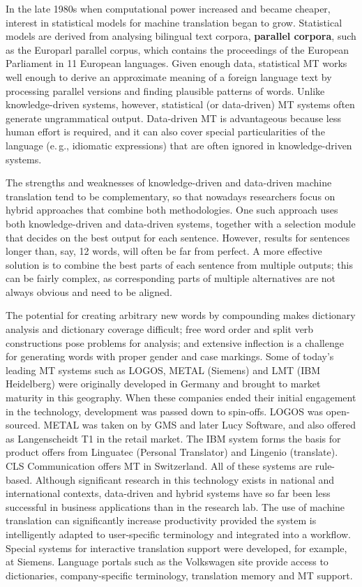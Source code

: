\documentclass[]{../../metanetpaper}
\begin{document}
\begin{multicols}{2}
In the late 1980s when computational power increased and became cheaper, interest in statistical models for machine translation began to grow. Statistical models are derived from analysing bilingual text corpora, \textbf{parallel corpora}, such as the Europarl parallel corpus, which contains the proceedings of the European Parliament in 11 European languages. Given enough data, statistical MT works well enough to derive an approximate meaning of a foreign language text by processing parallel versions and finding plausible patterns of words. Unlike knowledge-driven systems, however, statistical (or data-driven) MT systems often generate ungrammatical output. Data-driven MT is advantageous because less human effort is required, and it can also cover special particularities of the language (e.\,g., idiomatic expressions) that are often ignored in knowledge-driven systems. 

The strengths and weaknesses of knowledge-driven and data-driven machine translation tend to be complementary, so that nowadays researchers focus on hybrid approaches that combine both methodologies. One such approach uses both knowledge-driven and data-driven systems, together with a selection module that decides on the best output for each sentence. However, results for sentences longer than, say, 12 words, will often be far from perfect. A more effective solution is to combine the best parts of each sentence from multiple outputs; this can be fairly complex, as corresponding parts of multiple alternatives are not always obvious and need to be aligned. 


The potential for creating arbitrary new words by compounding makes dictionary analysis and dictionary coverage difficult; free word order and split verb constructions pose problems for analysis; and extensive inflection is a challenge for generating words with proper gender and case markings.  Some of today's leading MT systems such as LOGOS, METAL (Siemens) and LMT (IBM Heidelberg) were originally developed in Germany and brought to market maturity in this geography. When these companies ended their initial engagement in the technology, development was passed down to spin-offs. LOGOS was open-sourced. METAL was taken on by GMS and later Lucy Software, and also offered as Langenscheidt T1 in the retail market. The IBM system forms the basis for product offers from Linguatec (Personal Translator) and Lingenio (translate). CLS Communication offers MT in Switzerland. All of these systems are rule-based. Although significant research in this technology exists in national and international contexts, data-driven and hybrid systems have so far been less successful in business applications than in the research lab.  The use of machine translation can significantly increase productivity provided the system is intelligently adapted to user-specific terminology and integrated into a workflow. Special systems for interactive translation support were developed, for example, at Siemens. Language portals such as the Volkswagen site provide access to dictionaries, company-specific terminology, translation memory and MT support.


\end{multicols}
\end{document}

